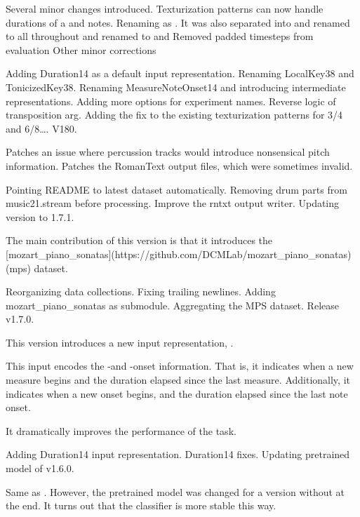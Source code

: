 Several minor changes introduced.
Texturization patterns can now handle durations of a  and  notes.
Renaming  as . It was also separated into  and 
 renamed to  all throughout
 and  renamed to  and 
Removed padded timesteps from evaluation
Other minor corrections

Adding Duration14 as a default input representation.
Renaming LocalKey38 and TonicizedKey38.
Renaming MeasureNoteOnset14 and introducing intermediate representations.
Adding more options for experiment names.
Reverse logic of transposition arg.
Adding the fix to the existing texturization patterns for 3/4 and 6/8….
V180.

Patches an issue where percussion tracks would introduce nonsensical pitch information.
Patches the RomanText output files, which were sometimes invalid.

Pointing README to latest dataset automatically.
Removing drum parts from music21.stream before processing.
Improve the rntxt output writer.
Updating version to 1.7.1.

The main contribution of this version is that it introduces the [mozart_piano_sonatas](https://github.com/DCMLab/mozart_piano_sonatas) (mps) dataset.

Reorganizing data collections.
Fixing trailing newlines.
Adding mozart_piano_sonatas as submodule.
Aggregating the MPS dataset.
Release v1.7.0.

This version introduces a new input representation, .

This input encodes the -and -onset information. That is, it indicates when a new measure begins and the duration elapsed since the last measure. Additionally, it indicates when a new onset begins, and the duration elapsed since the last note onset.

It dramatically improves the performance of the  task.


Adding Duration14 input representation.
Duration14 fixes.
Updating pretrained model of v1.6.0.

Same as . However, the pretrained model was changed for a version without  at the end. It turns out that the  classifier is more stable this way.

